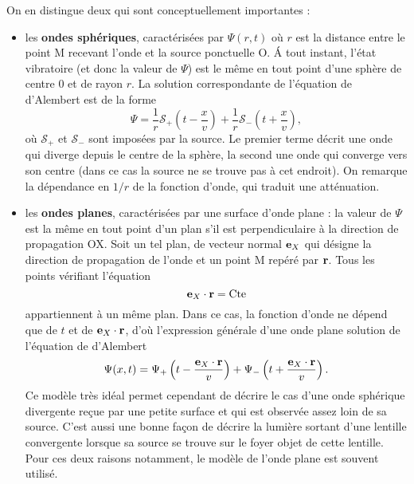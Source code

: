 \documentclass[11pt,a4paper]{report}
\begin{document}
On en distingue deux qui sont conceptuellement importantes :
\begin{itemize}
	\item les \textbf{ondes sphériques}, caractérisées par $\Psi(r,t)$ où $r$ est la distance entre le point M recevant l'onde et la source ponctuelle O. \'A tout instant, l'état vibratoire (et donc la valeur de $\Psi$) est le même en tout point d'une sphère de centre 0 et de rayon $r$. La solution correspondante de l'équation de d'Alembert est de la forme
	\begin{equation}
		\Psi = \frac{1}{r}\mathcal{S}_+\left(t - \frac{x}{v}\right) + \frac{1}{r}\mathcal{S}_-\left(t + \frac{x}{v}\right),
	\end{equation}
	où $\mathcal{S}_+$ et $\mathcal{S}_-$ sont imposées par la source. Le premier terme décrit une onde qui diverge depuis le centre de la sphère, la second une onde qui converge vers son centre (dans ce cas la source ne se trouve pas à cet endroit). On remarque la dépendance en $1/r$ de la fonction d'onde, qui traduit une atténuation.\\ 

	\item les \textbf{ondes planes}, caractérisées par une surface d'onde plane : la valeur de $\Psi$ est la même en tout point d'un plan s'il est perpendiculaire à la direction de propagation OX. Soit un tel plan, de vecteur normal $\bold{e}_X$ qui désigne la direction de propagation de l'onde et un point M repéré par $\bold{r}$. Tous les points vérifiant l'équation
	\begin{equation}
		\bold{e}_X\cdot\bold{r} = \text{Cte}
	\end{equation}	 
	appartiennent à un même plan. Dans ce cas, la fonction d'onde ne dépend que de $t$ et de $\bold{e}_X\cdot\bold{r}$, d'où l'expression générale d'une onde plane solution de l'équation de d'Alembert
	\begin{equation}
		\Psi(x,t) = \Psi_+\left(t - \frac{\bold{e}_X\cdot\bold{r}}{v}\right) + \Psi_-\left(t + \frac{\bold{e}_X\cdot\bold{r}}{v}\right).
	\end{equation}
	Ce modèle très idéal permet cependant de décrire le cas d'une onde sphérique divergente reçue par une petite surface et qui est observée assez loin de sa source. C'est aussi une bonne 		façon de décrire la lumière sortant d'une lentille convergente lorsque sa source se trouve sur le foyer objet de cette lentille. Pour ces deux raisons notamment, le modèle de l'onde 			plane est souvent utilisé.
\end{itemize} 
\end{document}
